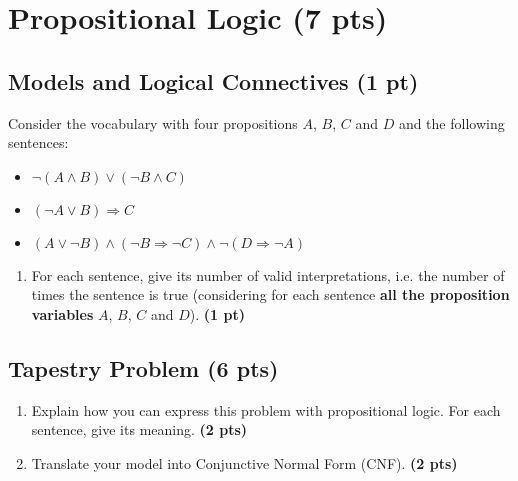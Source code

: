 \documentclass[11pt,a4paper]{report}
\begin{document}
\section{Propositional Logic (7 pts)}

\subsection{Models and Logical Connectives (1 pt)}
Consider the vocabulary with four propositions $A$, $B$, $C$ and $D$ and the
following sentences:
\begin{itemize}
\item $\neg ( A \land B) \lor (\neg B \land C)$
\item $(\neg A \lor B) \Rightarrow C$
\item $( A \lor \neg B) \land (\neg B \Rightarrow \neg C) \land \neg (D \Rightarrow \neg A)$
\end{itemize}

\begin{enumerate}
  \item For each sentence, give its number of valid interpretations, i.e. the number of times the sentence is true (considering for each sentence {\bf all the proposition variables} $A$, $B$, $C$ and $D$). \textbf{(1 pt)}
\end{enumerate}

\begin{answer}
\end{answer}



\subsection{Tapestry Problem (6 pts)}

\begin{enumerate}
\item Explain how you can express this problem with propositional logic. For each sentence, give its meaning. \textbf{(2 pts)}
\end{enumerate}

\begin{answers}[10cm]
\end{answers}



\begin{enumerate}
\setcounter{enumi}{1}
\item Translate your model into Conjunctive Normal Form (CNF). \textbf{(2 pts)}
\end{enumerate}
\end{document}
